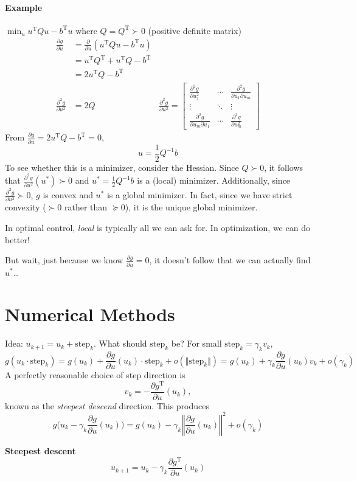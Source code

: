 \documentclass[letterpaper,12pt,titlepage]{report}
\newcommand{\trans}{^\text{T}}
\newcommand*\pder[2]{\frac{\partial #1}{\partial #2}}
\theoremstyle{plain}
\theoremstyle{definition}
\begin{document}
\paragraph{Example} $\displaystyle \min_u u\trans Q u - b\trans u$ where $Q=Q\trans\succ 0$ (positive definite matrix)
\begin{align}
\pder{g}{u} &= \pder{}{u} (u\trans Qu - b\trans u) \\
&= u\trans Q\trans + u\trans Q - b\trans \\
&= 2u\trans Q - b\trans \\[-3ex]
  \pder{^2 g}{u^2} &= 2Q
& \pder{^2 g}{u^2} = \begin{bmatrix}
  \pder{^2 g}{u_1^2} & \cdots & \pder{^2 g}{u_1 \partial u_m} \\
  \vdots & \ddots & \vdots \\
  \pder{^2 g}{u_m \partial u_1} & \cdots & \pder{^2 g}{u_m^2}
\end{bmatrix}
\end{align}
From $\pder{g}{u} = 2u\trans Q-b\trans = 0$,
\[ u = \frac12 Q^{-1} b \]
To see whether this is a minimizer, consider the Hessian. Since $Q \succ 0$, it follows that $\pder{^2 g}{u^2} (u^*) \succ 0$ and $u^*=\frac12 Q^{-1} b$ is a (local) minimizer. Additionally, since $\pder{^2 g}{u^2} \succ 0$, $g$ is convex and $u^*$ is a global minimizer. In fact, since we have strict convexity ($\succ 0$ rather than $\succeq 0$), it is the unique global minimizer.

In optimal control, \emph{local} is typically all we can ask for. In optimization, we can do better!

But wait, just because we know $\pder{g}{u}=0$, it doesn't follow that we can actually find $u^*$\dots

\section{Numerical Methods}
Idea: $u_{k+1}=u_k+\text{step}_k$. What should $\text{step}_k$ be? For small $\text{step}_k=\gamma_k v_k$,
\[ g(u_k \cdot \text{step}_k) = g(u_k) + \pder{g}{u}(u_k) \cdot \text{step}_k + o(\Vert \text{step}_k \Vert) = g(u_k) + \gamma_k \pder{g}{u}(u_k) v_k + o(\gamma_k) \]
A perfectly reasonable choice of step direction is
\[ v_k=-\pder{g\trans}{u}(u_k), \]
known as the \emph{steepest descend} direction. This produces
\[ g \Big( u_k - \gamma_k\pder{g}{u}(u_k) \Big) = g(u_k) - \gamma_k \left\Vert \pder{g}{u}(u_k) \right\Vert^2 + o(\gamma_k) \]

\begin{framed}
  \textbf{Steepest descent} \[ u_{k+1} = u_k - \gamma_k \pder{g\trans}{u} (u_k) \]
\end{framed}
\end{document}
